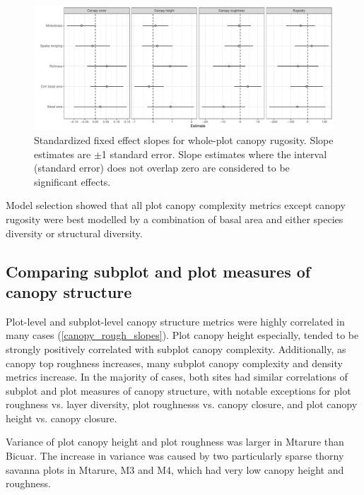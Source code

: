 \documentclass[11pt,a4paper]{article}
\begin{document}
\begin{figure}
	\includegraphics[width=\linewidth]{canopy_rough_slopes}
	\caption{Standardized fixed effect slopes for whole-plot canopy rugosity. Slope estimates are $\pm$1 standard error. Slope estimates where the interval (standard error) does not overlap zero are considered to be significant effects.}
	\label{canopy_rough_slopes}
\end{figure}

Model selection showed that all plot canopy complexity metrics except canopy rugosity were best modelled by a combination of basal area and either species diversity or structural diversity. 



\subsection{Comparing subplot and plot measures of canopy structure}

Plot-level and subplot-level canopy structure metrics were highly correlated in many cases (\autoref{canopy_rough_slopes}). Plot canopy height especially, tended to be strongly positively correlated with subplot canopy complexity. Additionally, as canopy top roughness increases, many subplot canopy complexity and density metrics increase. In the majority of cases, both sites had similar correlations of subplot and plot measures of canopy structure, with notable exceptions for plot roughness vs. layer diversity, plot roughnesss vs. canopy closure, and plot canopy height vs. canopy closure.

Variance of plot canopy height and plot roughness was larger in Mtarure than Bicuar. The increase in variance was caused by two particularly sparse thorny savanna plots in Mtarure, M3 and M4, which had very low canopy height and roughness.
\end{document}
